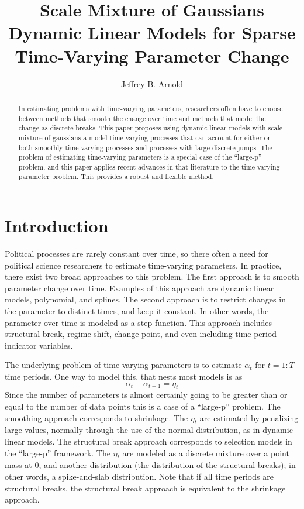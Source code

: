 \documentclass{article}
\author{Jeffrey B. Arnold}
\title{Scale Mixture of Gaussians Dynamic Linear Models for Sparse 
  Time-Varying Parameter Change}
\begin{document}
\maketitle{}

\begin{abstract}
  In estimating problems with time-varying parameters, researchers often have to choose between methods that smooth the change over time and methods that model the change as discrete breaks.
  This paper proposes using dynamic linear models with scale-mixture of gaussians a model time-varying processes that can account for either or both smoothly time-varying processes and processes with large discrete jumps.
  The problem of estimating time-varying parameters is a special case of the ``large-p'' problem, and this paper applies recent advances in that literature to the time-varying parameter problem.
  This provides a robust and flexible method. 
\end{abstract}

\section{Introduction}
\label{sec:introduction}

Political processes are rarely constant over time, so there often a need for political science researchers to estimate time-varying parameters. 
In practice, there exist two broad approaches to this problem.
The first approach is to smooth parameter change over time.
Examples of this approach are dynamic linear models, polynomial, and splines.
The second approach is to restrict changes in the parameter to distinct times, and keep it constant. 
In other words, the parameter over time is modeled as a step function. 
This approach includes structural break, regime-shift, change-point, and even including time-period indicator variables.

The underlying problem of time-varying parameters is to estimate $\alpha_{t}$ for $t = 1:T$ time periods. 
One way to model this, that nests most models is as 
\begin{equation}
  \label{eq:7}
  \alpha_{t} - \alpha_{t-1}  = \eta_{t}
\end{equation}
Since the number of parameters is almost certainly going to be greater than or equal to the number of data points this is a case of a ``large-p'' problem.
The smoothing approach corresponds to shrinkage.
The $\eta_{t}$ are estimated by penalizing large values, normally through the use of the normal distribution, as in dynamic linear models.
The structural break approach corresponds to selection models in the ``large-p'' framework.
The $\eta_{t}$ are modeled as a discrete mixture over a point mass at 0, and another distribution (the distribution of the structural breaks); in other words, a spike-and-slab distribution.
Note that if all time periods are structural breaks, the structural break approach is equivalent to the shrinkage approach.
\end{document}
